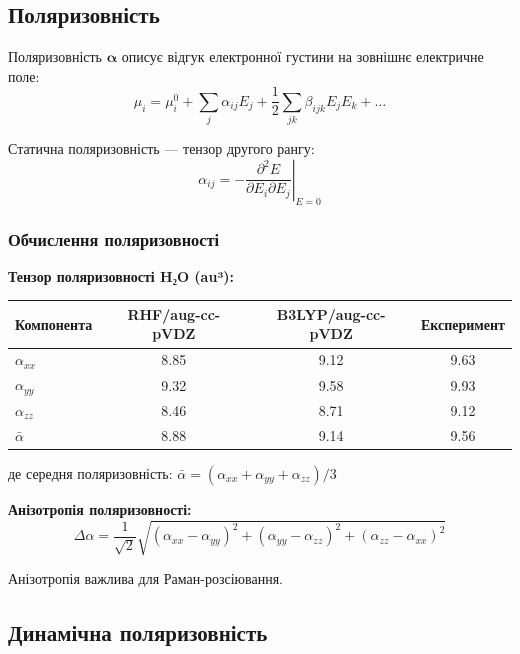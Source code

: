 \subsection{Поляризовність}

Поляризовність $\boldsymbol{\alpha}$ описує відгук електронної густини
на зовнішнє електричне поле:
\[
\mu_i = \mu_i^0 + \sum_j \alpha_{ij} E_j +
\frac{1}{2}\sum_{jk} \beta_{ijk} E_j E_k + \ldots
\]

Статична поляризовність --- тензор другого рангу:
\[
\alpha_{ij} = -\left.\frac{\partial^2 E}{\partial E_i \partial E_j}\right|_{E=0}
\]

\subsubsection{Обчислення поляризовності}


\textbf{Тензор поляризовності H₂O (au³):}
\begin{center}
\begin{tabular}{lccc}
\toprule
Компонента & RHF/aug-cc-pVDZ & B3LYP/aug-cc-pVDZ & Експеримент \\
\midrule
$\alpha_{xx}$ & 8.85 & 9.12 & 9.63 \\
$\alpha_{yy}$ & 9.32 & 9.58 & 9.93 \\
$\alpha_{zz}$ & 8.46 & 8.71 & 9.12 \\
\midrule
$\bar{\alpha}$ & 8.88 & 9.14 & 9.56 \\
\bottomrule
\end{tabular}
\end{center}

де середня поляризовність: $\bar{\alpha} = (\alpha_{xx} + \alpha_{yy} + \alpha_{zz})/3$

\textbf{Анізотропія поляризовності:}
\[
\Delta\alpha = \frac{1}{\sqrt{2}}\sqrt{(\alpha_{xx}-\alpha_{yy})^2 +
(\alpha_{yy}-\alpha_{zz})^2 + (\alpha_{zz}-\alpha_{xx})^2}
\]

Анізотропія важлива для Раман-розсіювання.

\subsection{Динамічна поляризовність}

